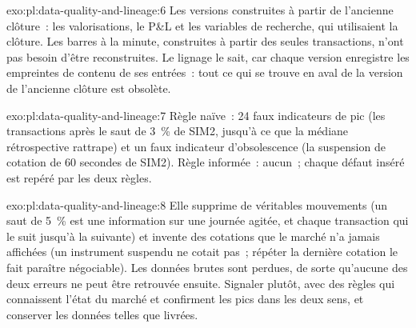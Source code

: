 \begin{solution}{exo:pl:data-quality-and-lineage:6}
Les versions construites à partir de l'ancienne clôture~: les valorisations, le P\&L et les variables de recherche, qui utilisaient la clôture. Les barres à la minute, construites à partir
des seules transactions, n'ont pas besoin d'être reconstruites. Le lignage le sait, car chaque version enregistre les empreintes de contenu de ses entrées~: tout ce qui
se trouve en aval de la version de l'ancienne clôture est obsolète.
\end{solution}

\begin{solution}{exo:pl:data-quality-and-lineage:7}
Règle naïve~: 24 faux indicateurs de pic (les transactions après le saut de 3~\% de SIM2, jusqu'à ce que la médiane rétrospective rattrape) et un faux indicateur d'obsolescence
(la suspension de cotation de 60 secondes de SIM2). Règle informée~: aucun~; chaque défaut inséré est repéré par les deux règles.
\end{solution}

\begin{solution}{exo:pl:data-quality-and-lineage:8}
Elle supprime de véritables mouvements (un saut de 5~\% est une information sur une journée agitée, et chaque transaction qui le suit jusqu'à la suivante) et invente des cotations
que le marché n'a jamais affichées (un instrument suspendu ne cotait pas~; répéter la dernière cotation le fait paraître négociable). Les données brutes sont perdues,
de sorte qu'aucune des deux erreurs ne peut être retrouvée ensuite. Signaler plutôt, avec des règles qui connaissent l'état du marché et confirment les pics dans les deux sens, et conserver
les données telles que livrées.
\end{solution}

